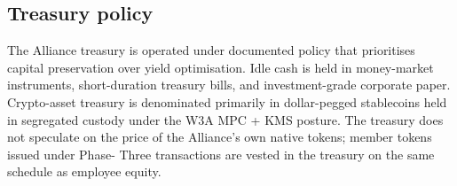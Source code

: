 \subsection{Treasury policy}

The Alliance treasury is operated under documented policy that
prioritises capital preservation over yield optimisation. Idle cash is
held in money-market instruments, short-duration treasury bills, and
investment-grade corporate paper. Crypto-asset treasury is denominated
primarily in dollar-pegged stablecoins held in segregated custody under
the W3A MPC + KMS posture. The treasury does not speculate on the price
of the Alliance's own native tokens; member tokens issued under Phase-
Three transactions are vested in the treasury on the same schedule as
employee equity.
